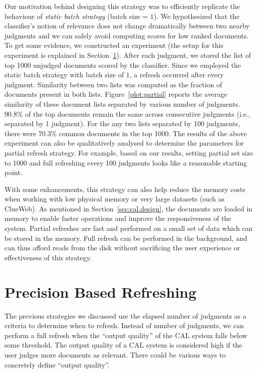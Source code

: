 Our motivation behind designing this strategy was to efficiently replicate the
behaviour of \textit{static batch strategy} (batch size = $1$). We hypothesized
that the classifier's notion of relevance does not change dramatically between
two nearby judgments and we can safely avoid computing scores for low ranked
documents. To get some evidence, we constructed an experiment (the setup for
this experiment is explained in Section~\ref{}). After each judgment, we stored
the list of top 1000 unjudged documents scored by the classifier. Since we
employed the static batch strategy with batch size of $1$, a refresh occurred
after every judgment. Similarity between two lists was computed as the fraction
of documents present in both lists.  Figure~\ref{plot:partial} reports the
average similarity of these document lists separated by various number of
judgments. $90.8\%$ of the top documents remain the same across consecutive
judgments (i.e., separated by 1 judgment). For the any two lists separated by
100 judgments, there were $70.3\%$ common documents in the top 1000.  The
results of the above experiment can also be qualitatively analysed to determine
the parameters for partial refresh strategy. For example, based on our results,
setting partial set size to 1000 and full refreshing every 100 judgments looks
like a reasonable starting point.

With some enhancements, this strategy can also help reduce the memory costs
when working with low physical memory or very large datasets (such as ClueWeb).
As mentioned in Section~\ref{sec:cal.design}, the documents are loaded in memory
to enable faster operations and improve the responsiveness of the system.
Partial refreshes are fast and performed on a small set of data which can be
stored in the memory. Full refresh can be performed in the background, and can
thus afford reads from the disk without sacrificing the user experience or
effectiveness of this strategy.

\section{Precision Based Refreshing}

The previous strategies we discussed use the elapsed number of judgments as
a criteria to determine when to refresh. Instead of number of judgments, we can
perform a full refresh when the ``output quality'' of the CAL system falls below
some threshold. The output quality of a CAL system is considered high if the
user judges more documents as relevant. There could be various ways to
concretely define ``output quality''.

